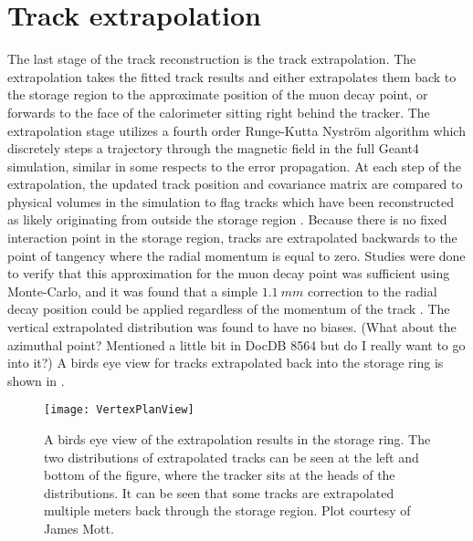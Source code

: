 



\section{Track extrapolation}
\label{sec:TrackExtrapolation}

The last stage of the track reconstruction is the track extrapolation. The extrapolation takes the fitted track results and either extrapolates them back to the storage region to the approximate position of the muon decay point, or forwards to the face of the calorimeter sitting right behind the tracker. The extrapolation stage utilizes a fourth order Runge-Kutta Nystr\"{o}m algorithm \cite{SCThesis} which discretely steps a trajectory through the magnetic field in the full \gmtwo Geant4 simulation, similar in some respects to the error propagation. At each step of the extrapolation, the updated track position and covariance matrix are compared to physical volumes in the simulation to flag tracks which have been reconstructed as likely originating from outside the storage region \cite{SCThesis,extrapolationerrors}. Because there is no fixed interaction point in the storage region, tracks are extrapolated backwards to the point of tangency where the radial momentum is equal to zero. Studies were done to verify that this approximation for the muon decay point was sufficient using Monte-Carlo, and it was found that a simple $\SI{1.1}{mm}$ correction to the radial decay position could be applied regardless of the momentum of the track \cite{SCThesis}. The vertical extrapolated distribution was found to have no biases. (What about the azimuthal point? Mentioned a little bit in DocDB 8564 but do I really want to go into it?) A birds eye view for tracks extrapolated back into the storage ring is shown in .


\begin{figure}[]
    \centering
    \texttt{[image: VertexPlanView]}
    \caption[Birds eye view of extrapolation in ring]{A birds eye view of the extrapolation results in the storage ring. The two distributions of extrapolated tracks can be seen at the left and bottom of the figure, where the tracker sits at the heads of the distributions. It can be seen that some tracks are extrapolated multiple meters back through the storage region. Plot courtesy of James Mott.}    
    \label{fig:VertexPlanView}
\end{figure}



